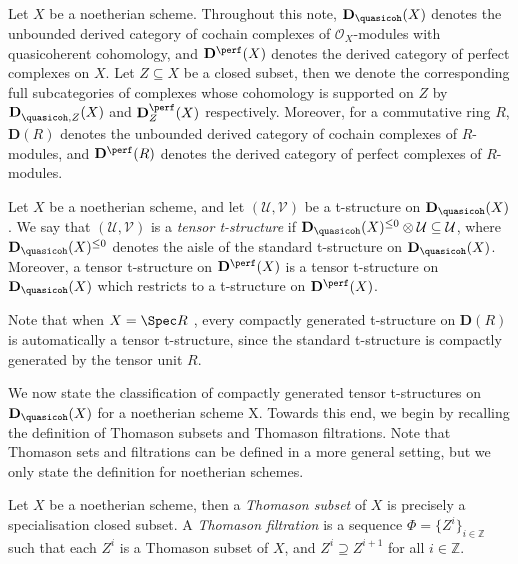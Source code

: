 Let $X$ be a noetherian scheme. Throughout this note, $\mathbf{D}_{\quasicoh}(X)$ denotes the unbounded derived category of cochain complexes of $\mathcal{O}_X$-modules with quasicoherent cohomology, and $\mathbf{D}^{\perf}(X)$ denotes the derived category of perfect complexes on $X$. Let $Z\subseteq X$ be a closed subset, then we denote the corresponding full subcategories of complexes whose cohomology is supported on $Z$ by $\mathbf{D}^{}_{\quasicoh, Z}(X)$ and $\mathbf{D}^{\perf}_{Z}(X)$ respectively. Moreover, for a commutative ring $R$, $\mathbf{D}(R)$ denotes the unbounded derived category of cochain complexes of $R$-modules, and $\mathbf{D}^{\perf}(R)$ denotes the derived category of perfect complexes of $R$-modules.

\begin{Def}
    Let $X$ be a noetherian scheme, and let $(\mathcal{U}, \mathcal{V})$ be a t-structure on $\mathbf{D}_{\quasicoh}(X)$. We say that $(\mathcal{U}, \mathcal{V})$ is a \textit{tensor t-structure} if $\mathbf{D}_{\quasicoh}(X)^{\leq 0} \otimes \mathcal{U} \subseteq \mathcal{U}$, where $\mathbf{D}_{\quasicoh}(X)^{\leq 0}$ denotes the aisle of the standard t-structure on $\mathbf{D}_{\quasicoh}(X)$. Moreover, a tensor t-structure on $\mathbf{D}^{\perf}(X)$ is a tensor t-structure on $\mathbf{D}_{\quasicoh}(X)$ which restricts to a t-structure on $\mathbf{D}^{\perf}(X)$.
\end{Def}



Note that when $X=\Spec R$ , every compactly generated t-structure on $\mathbf{D}(R)$ is automatically a tensor t-structure, since the standard t-structure is compactly generated by the tensor unit $R$. 

We now state the classification of compactly generated tensor t-structures on $\mathbf{D}_{\quasicoh}(X)$ for a noetherian scheme X. Towards this end, we begin by recalling the definition of Thomason subsets and Thomason filtrations. Note that Thomason sets and filtrations can be defined in a more general setting, but we only state the definition for noetherian schemes.

\begin{Def}
    Let $X$ be a noetherian scheme, then a \emph{Thomason subset} of $X$ is precisely a specialisation closed subset. A \emph{Thomason filtration} is a sequence $\Phi = \{Z^i\}_{i \in \mathbb{Z}}$ such that each $Z^i$ is a Thomason subset of $X$, and $Z^i \supseteq Z^{i+1}$ for all $i \in \mathbb{Z}$.
\end{Def}

